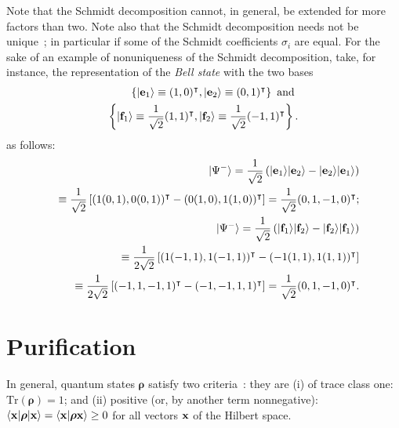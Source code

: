 Note that the Schmidt decomposition cannot, in general, be extended for more factors than two.
Note also that the Schmidt decomposition needs not be unique~\cite{ekert:415};
in particular if some of the Schmidt coefficients $\sigma_i$ are equal.
For the sake of an example of nonuniqueness of the Schmidt decomposition,
take, for instance, the representation of the {\em Bell state} 
with the two bases
\begin{equation}
\begin{split}
\left\{
\vert {\bf e}_1\rangle \equiv (1,0)^\intercal ,
\vert {\bf e}_2\rangle \equiv (0,1)^\intercal
\right\}
\textrm{ and }\\
\left\{
\vert {\bf f}_1\rangle \equiv \frac{1}{\sqrt{2}}(1,1)^\intercal ,
\vert {\bf f}_2\rangle \equiv \frac{1}{\sqrt{2}}(-1,1)^\intercal
\right\}.
\end{split}
\end{equation}
as follows:
\begin{equation}
\begin{split}
\vert {\Psi^-} \rangle =
\frac{1}{\sqrt{2}}
\left(
\vert {\bf e}_1\rangle
\vert {\bf e}_2\rangle
-
\vert {\bf e}_2\rangle
\vert {\bf e}_1\rangle
\right)\\
\quad \equiv
\frac{1}{\sqrt{2}}
\left[
(1 (0,1),0(0,1))^\intercal - (0 (1,0),1(1,0))^\intercal \right] = \frac{1}{\sqrt{2}} (0,1,-1,0)^\intercal ; \\
\vert {\Psi^-} \rangle =
\frac{1}{\sqrt{2}}
\left(
\vert {\bf f}_1\rangle
\vert {\bf f}_2\rangle
-
\vert {\bf f}_2\rangle
\vert {\bf f}_1\rangle
\right) \\
\quad \equiv
\frac{1}{2\sqrt{2}}
\left[
(1 (-1,1),1(-1,1))^\intercal - ( -1 (1,1),1(1,1))^\intercal \right]  \\
\quad \equiv
\frac{1}{2\sqrt{2}}
\left[
( -1  , 1 ,-1 ,1 )^\intercal  - ( -1,-1 ,1 ,1 )^\intercal \right]
 = \frac{1}{\sqrt{2}} (0,1,-1,0)^\intercal
.
\end{split}
\end{equation}



\section{Purification}
\label{2015-m-ch-fdvs-purification}


In general, quantum states ${\boldsymbol{\rho}}$ satisfy two criteria~\cite{ba-89}:  they are
(i) of trace class one:
$\textrm{Tr}({\boldsymbol{\rho}}) =1$;
and
(ii) positive (or, by another term nonnegative):
$
\langle {\bf x} \vert {\boldsymbol{\rho}} \vert {\bf x} \rangle
=\langle {\bf x} \vert {\boldsymbol{\rho}}  {\bf x} \rangle \ge  0
$ for all vectors ${\bf x}$ of the  Hilbert space.

